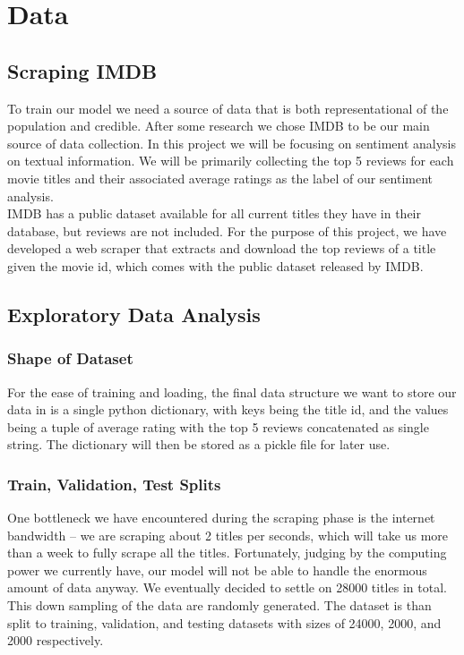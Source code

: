 \documentclass[11pt]{article}
\newcommand{\np}{\newpage}
\begin{document}
\section{Data}
\subsection{Scraping IMDB}
To train our model we need a source of data that is both representational of the population and credible. After some research we chose IMDB to be our main source of data collection.  In this project we will be focusing on sentiment analysis on textual information.  We will be primarily collecting the top 5 reviews for each movie titles and their associated average ratings as the label of our sentiment analysis.
\\[2mm]
IMDB has a public dataset available for all current titles they have in their database, but reviews are not included.  For the purpose of this project, we have developed a web scraper that extracts and download the top reviews of a title given the movie id, which comes with the public dataset released by IMDB.


\subsection{Exploratory Data Analysis}
\subsubsection{Shape of Dataset}
For the ease of training and loading, the final data structure we want to store our data in is a single python dictionary, with keys being the title id, and the values being a tuple of average rating with the top 5 reviews concatenated as single string.  The dictionary will then be stored as a pickle file for later use.

\subsubsection{Train, Validation, Test Splits}
One bottleneck we have encountered during the scraping phase is the internet bandwidth -- we are scraping about 2 titles per seconds, which will take us more than a week to fully scrape all the titles.  Fortunately, judging by the computing power we currently have, our model will not be able to handle the enormous amount of data anyway.  We eventually decided to settle on  28000 titles in total.  This down sampling of the data are randomly generated.  The dataset is than split to training, validation, and testing datasets with sizes of 24000, 2000, and 2000 respectively.
\np
\end{document}
